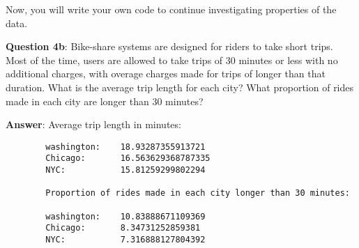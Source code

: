 \documentclass[11pt]{article}
\begin{document}
Now, you will write your own code to continue investigating properties
of the data.

\textbf{Question 4b}: Bike-share systems are designed for riders to take
short trips. Most of the time, users are allowed to take trips of 30
minutes or less with no additional charges, with overage charges made
for trips of longer than that duration. What is the average trip length
for each city? What proportion of rides made in each city are longer
than 30 minutes?

\textbf{Answer}: Average trip length in minutes:

\begin{verbatim}
        washington:    18.93287355913721
        Chicago:       16.563629368787335
        NYC:           15.81259299802294
        
        Proportion of rides made in each city longer than 30 minutes:
        
        washington:    10.83888671109369
        Chicago:       8.34731252859381
        NYC:           7.316888127804392
\end{verbatim}
\end{document}

